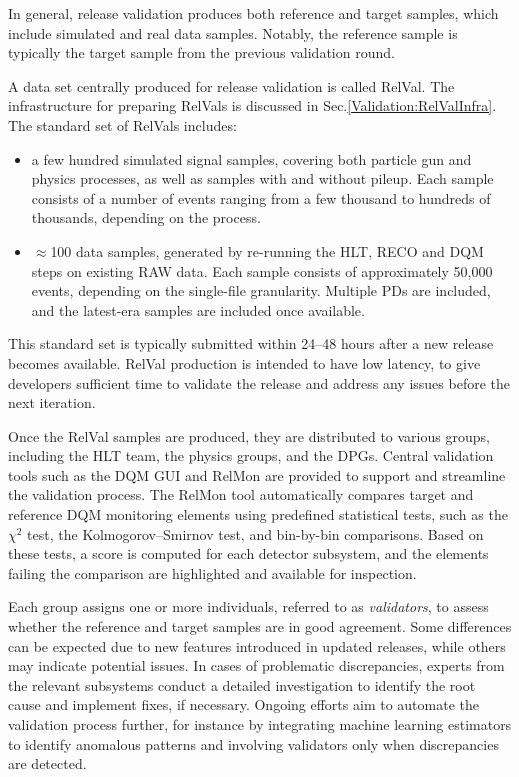 In general, release validation produces both reference and target samples, which include simulated and real data samples. Notably, the reference sample is typically the target sample from the previous validation round.

A data set centrally produced for release validation is called \gls{RelVal}. The infrastructure for preparing \glspl{RelVal} is discussed in Sec.\ref{Validation:RelValInfra}. The standard set of \glspl{RelVal} includes:
\begin{itemize}
    \item a few hundred simulated signal samples, covering both particle gun and physics processes, as well as samples with and without pileup. Each sample consists of a number of events ranging from a few thousand to hundreds of thousands, depending on the process.
    \item $\approx$100 data samples, generated by re-running the \gls{HLT}, \gls{RECO} and \gls{DQM} steps on existing \gls{RAW} data. Each sample consists of approximately 50,000 events, depending on the single-file granularity. Multiple \glspl{PD} are included, and the latest-era samples are included once available.  
\end{itemize}

This standard set is typically submitted within 24--48 hours after a new release becomes available. \gls{RelVal} production is intended to have low latency, to give developers sufficient time to validate the release and address any issues before the next iteration.

Once the \gls{RelVal} samples are produced, they are distributed to various groups, including the \gls{HLT} team, the physics groups, and the \glspl{DPG}. Central validation tools such as the \gls{DQM} \gls{GUI} and \gls{RelMon} are provided to support and streamline the validation process. The \gls{RelMon} tool automatically compares target and reference \gls{DQM} monitoring elements using predefined statistical tests, such as the $\chi^2$ test, the Kolmogorov--Smirnov test, and bin-by-bin comparisons. Based on these tests, a score is computed for each detector subsystem, and the elements failing the comparison are highlighted and available for inspection. 

Each group assigns one or more individuals, referred to as \emph{validators}, to assess whether the reference and target samples are in good agreement. Some differences can be expected due to new features introduced in updated releases, while others may indicate potential issues. In cases of problematic discrepancies, experts from the relevant subsystems conduct a detailed investigation to identify the root cause and implement fixes, if necessary. Ongoing efforts aim to automate the validation process further, for instance by integrating machine learning estimators to identify anomalous patterns and involving validators only when discrepancies are detected.

